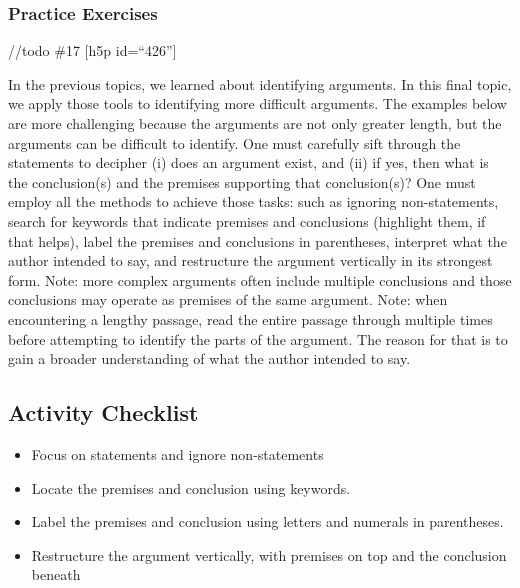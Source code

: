 \documentclass[
]{book}
\begin{document}
\hypertarget{practice-exercises-2}{%
\subsubsection*{Practice Exercises}\label{practice-exercises-2}}

//todo \#17
{[}h5p id=``426''{]}

In the previous topics, we learned about identifying arguments. In this final topic, we apply those tools to identifying more difficult arguments. The examples below are more challenging because the arguments are not only greater length, but the arguments can be difficult to identify. One must carefully sift through the statements to decipher (i) does an argument exist, and (ii) if yes, then what is the conclusion(s) and the premises supporting that conclusion(s)? One must employ all the methods to achieve those tasks: such as ignoring non-statements, search for keywords that indicate premises and conclusions (highlight them, if that helps), label the premises and conclusions in parentheses, interpret what the author intended to say, and restructure the argument vertically in its strongest form. Note: more complex arguments often include multiple conclusions and those conclusions may operate as premises of the same argument. Note: when encountering a lengthy passage, read the entire passage through multiple times before attempting to identify the parts of the argument. The reason for that is to gain a broader understanding of what the author intended to say.

\hypertarget{activity-checklist-4}{%
\subsection*{Activity Checklist}\label{activity-checklist-4}}

\begin{reflect}
\begin{itemize}
\item
  Focus on statements and ignore non-statements
\item
  Locate the premises and conclusion using keywords.
\item
  Label the premises and conclusion using letters and numerals in parentheses.
\item
  Restructure the argument vertically, with premises on top and the conclusion beneath
\end{itemize}
\end{reflect}
\end{document}
